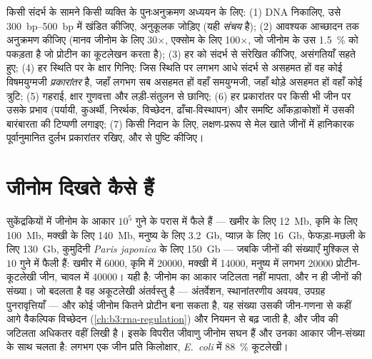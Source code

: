 \begin{method}[प्रतिदर्श से प्रकारांतरों तक]\label{met:b3:genomics:pipeline}
किसी संदर्भ के सामने किसी व्यक्ति के पुनःअनुक्रमण अध्ययन के लिए: (1)
DNA निकालिए, उसे \qtyrange{300}{500}{bp} में खंडित कीजिए, अनुकूलक
जोड़िए (यही \emph{संचय} है); (2) आवश्यक आच्छादन तक अनुक्रमण कीजिए (मानव
जीनोम के लिए 30$\times$, एक्सोम के लिए 100$\times$, जो जीनोम के उस
\qty{1.5}{\%} को पकड़ता है जो प्रोटीन का कूटलेखन करता है); (3) हर 
को संदर्भ से संरेखित कीजिए, असंगतियाँ सहते हुए; (4) हर स्थिति पर
 के क्षार गिनिए: जिस स्थिति पर लगभग आधे  संदर्भ से असहमत हों
वह कोई विषमयुग्मजी \emph{प्रकारांतर} है, जहाँ लगभग सब असहमत हों वहाँ
समयुग्मजी, जहाँ थोड़े असहमत हों वहाँ कोई त्रुटि; (5) गहराई, क्षार
गुणवत्ता और लड़ी-संतुलन से छानिए; (6) हर प्रकारांतर पर किसी भी जीन पर
उसके प्रभाव (पर्यायी, कुअर्थी, निरर्थक, विच्छेदन, ढाँचा-विस्थापन) और
समष्टि आँकड़ाकोशों में उसकी बारंबारता की टिप्पणी लगाइए; (7) किसी निदान
के लिए, लक्षण-प्ररूप से मेल खाते जीनों में हानिकारक पूर्वानुमानित
दुर्लभ प्रकारांतर रखिए, और  से पुष्टि कीजिए।
\end{method}

\section{जीनोम दिखते कैसे हैं}

\begin{proposition}[जीनोम का आकार और जीनों की संख्या]\label{prop:b3:genomics:sizes}
सुकेंद्रकियों में जीनोम के आकार $10^{5}$ गुने के परास में फैले हैं ---
खमीर के लिए \qty{12}{Mb}, कृमि के लिए \qty{100}{Mb}, मक्खी के लिए
\qty{140}{Mb}, मनुष्य के लिए \qty{3.2}{Gb}, प्याज़ के लिए \qty{16}{Gb},
फेफड़ा-मछली के लिए \qty{130}{Gb}, कुमुदिनी \emph{Paris
japonica} के लिए \qty{150}{Gb} --- जबकि जीनों की संख्याएँ मुश्किल से
$10$ गुने में फैली हैं: खमीर में \num{6000}, कृमि में \num{20000},
मक्खी में \num{14000}, मनुष्य में लगभग \num{20000} प्रोटीन-कूटलेखी
जीन, चावल में \num{40000}। यही \emph{} है: जीनोम का आकार
जटिलता नहीं मापता, और न ही जीनों की संख्या। जो बदलता है वह अकूटलेखी
अंतर्वस्तु है --- अंतर्वेशन, स्थानांतरणीय अवयव, उपग्रह पुनरावृत्तियाँ ---
और कोई जीनोम कितने प्रोटीन बना सकता है, यह संख्या उसकी जीन-गणना से कहीं
आगे वैकल्पिक विच्छेदन (\cref{ch:b3:rna-regulation}) और नियमन से बढ़ जाती
है, और जीव की जटिलता अधिकतर वहीं लिखी है। इसके विपरीत जीवाणु जीनोम सघन
हैं और उनका आकार जीन-संख्या के साथ चलता है: लगभग एक जीन प्रति किलोक्षार,
\emph{E.~coli} में \qty{88}{\%} कूटलेखी।
\end{proposition}

